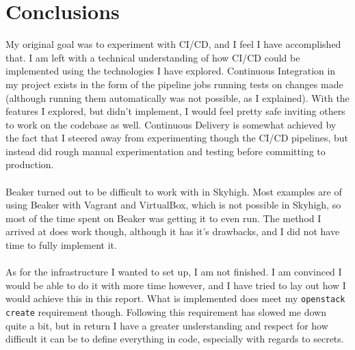 \section{Conclusions}

My original goal was to experiment with CI/CD, and I feel I have accomplished that. I am left with a technical understanding of how CI/CD could be implemented using the technologies I have explored. Continuous Integration in my project exists in the form of the pipeline jobs running tests on changes made (although running them automatically was not possible, as I explained). With the features I explored, but didn't implement, I would feel pretty safe inviting others to work on the codebase as well. Continuous Delivery is somewhat achieved by the fact that I steered away from experimenting though the CI/CD pipelines, but instead did rough manual experimentation and testing before committing to production.
\\
\\
Beaker turned out to be difficult to work with in Skyhigh. Most examples are of using Beaker with Vagrant and VirtualBox, which is not possible in Skyhigh, so most of the time spent on Beaker was getting it to even run. The method I arrived at does work though, although it has it's drawbacks, and I did not have time to fully implement it.
\\
\\
As for the infrastructure I wanted to set up, I am not finished. I am convinced I would be able to do it with more time however, and I have tried to lay out how I would achieve this in this report. What is implemented does meet my \texttt{openstack create} requirement though. Following this requirement has slowed me down quite a bit, but in return I have a greater understanding and respect for how difficult it can be to define everything in code, especially with regards to secrets.




\clearpage %

\nocite{*}



\clearpage %
\appendix

